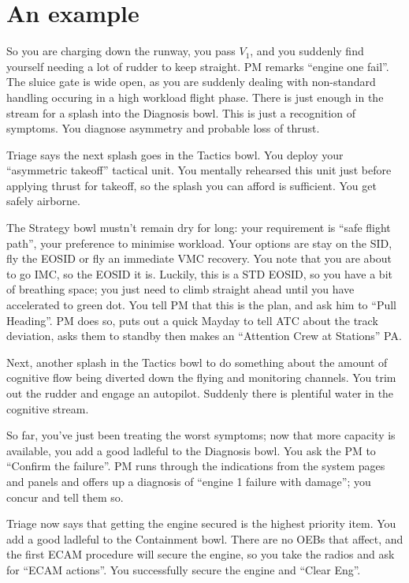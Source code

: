 \documentclass[a5paper,11pt,titlepage]{article}
\begin{document}
\section{An example}
\label{sec:example}
So you are charging down the runway, you pass $V_1$, and you suddenly
find yourself needing a lot of rudder to keep straight. PM remarks
``engine one fail''. The sluice gate is wide open, as you are suddenly
dealing with non-standard handling occuring in a high workload flight
phase. There is just enough in the stream for a splash into the
Diagnosis bowl. This is just a recognition of symptoms. You diagnose
asymmetry and probable loss of thrust.

Triage says the next splash goes in the Tactics bowl. You deploy your
``asymmetric takeoff'' tactical unit. You mentally rehearsed this unit
just before applying thrust for takeoff, so the splash you can afford is
sufficient. You get safely airborne.

The Strategy bowl mustn't remain dry for long: your requirement is
``safe flight path'', your preference to minimise workload. Your options
are stay on the SID, fly the EOSID or fly an immediate VMC recovery. You
note that you are about to go IMC, so the EOSID it is. Luckily, this is
a STD EOSID, so you have a bit of breathing space; you just need to
climb straight ahead until you have accelerated to green dot. You tell
PM that this is the plan, and ask him to ``Pull Heading''. PM does so,
puts out a quick Mayday to tell ATC about the track deviation, asks them
to standby then makes an ``Attention Crew at Stations'' PA.

Next, another splash in the Tactics bowl to do something about the
amount of cognitive flow being diverted down the flying and monitoring
channels. You trim out the rudder and engage an autopilot. Suddenly
there is plentiful water in the cognitive stream.

So far, you've just been treating the worst symptoms; now that more
capacity is available, you add a good ladleful to the Diagnosis bowl.
You ask the PM to ``Confirm the failure''. PM runs through the
indications from the system pages and panels and offers up a diagnosis of
``engine 1 failure with damage''; you concur and tell them so.

Triage now says that getting the engine secured is the highest priority
item. You add a good ladleful to the Containment bowl. There are no OEBs
that affect, and the first ECAM procedure will secure the engine, so you
take the radios and ask for ``ECAM actions''. You successfully secure
the engine and ``Clear Eng''.
\end{document}
